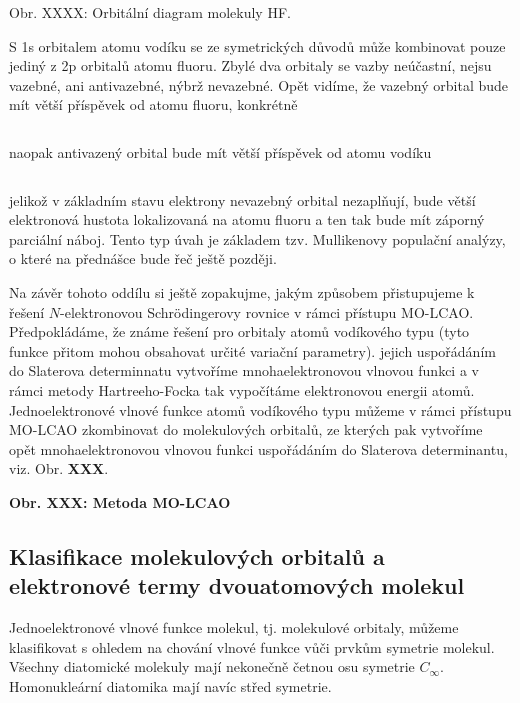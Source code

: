\bigskip
Obr. XXXX: Orbitální diagram molekuly HF.
\bigskip

\noindent S 1s orbitalem atomu vodíku se ze symetrických důvodů může kombinovat pouze jediný z 2p orbitalů atomu fluoru. Zbylé dva orbitaly se vazby neúčastní, nejsu vazebné, ani antivazebné, nýbrž nevazebné. Opět vidíme, že vazebný orbital bude mít větší příspěvek  od atomu fluoru, konkrétně

\begin{equation}
\label{rov:XXX}
\end{equation}


\noindent naopak antivazený orbital bude mít větší příspěvek od atomu vodíku

\begin{equation}
\label{rov:XXX}
\end{equation}


\noindent jelikož v základním stavu elektrony nevazebný orbital nezaplňují, bude větší elektronová hustota lokalizovaná na atomu fluoru a ten tak bude mít záporný parciální náboj. Tento typ úvah je základem tzv. Mullikenovy populační analýzy, o které na přednášce bude řeč ještě později.


Na závěr tohoto oddílu si ještě zopakujme, jakým způsobem přistupujeme k řešení $N$-elektronovou Schr\"odingerovy rovnice v rámci přístupu MO-LCAO. Předpokládáme, že známe řešení pro orbitaly atomů vodíkového typu (tyto funkce přitom mohou obsahovat určité variační parametry). jejich uspořádáním do Slaterova determinnatu vytvoříme mnohaelektronovou vlnovou funkci a v rámci metody Hartreeho-Focka tak vypočítáme elektronovou energii atomů. Jednoelektronové vlnové funkce atomů vodíkového typu můžeme v rámci přístupu MO-LCAO zkombinovat do molekulových orbitalů, ze kterých pak vytvoříme opět mnohaelektronovou vlnovou funkci uspořádáním do Slaterova determinantu, viz. Obr. \textbf{XXX}.


\bigskip
\textbf{Obr. XXX: Metoda MO-LCAO}
\bigskip

\subsection{Klasifikace molekulových orbitalů a elektronové termy dvouatomových molekul}
 
Jednoelektronové vlnové funkce molekul, tj. molekulové orbitaly, můžeme klasifikovat s ohledem na chování vlnové funkce vůči prvkům symetrie molekul. Všechny diatomické molekuly mají nekonečně četnou osu symetrie $C_\infty$. Homonukleární diatomika mají navíc střed symetrie.

